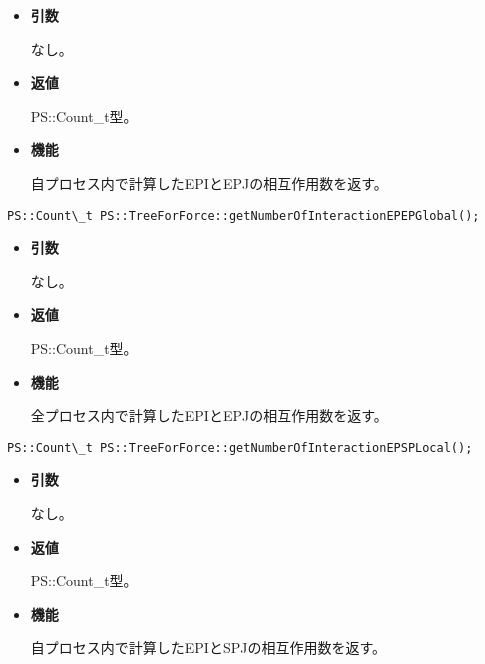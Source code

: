 \begin{itemize}

\item {\bf 引数}

なし。

\item {\bf 返値}

PS::Count\_t型。

\item {\bf 機能}

自プロセス内で計算したEPIとEPJの相互作用数を返す。

\end{itemize}

\begin{screen}
\begin{verbatim}
PS::Count\_t PS::TreeForForce::getNumberOfInteractionEPEPGlobal();
\end{verbatim}
\end{screen}

\begin{itemize}

\item {\bf 引数}

なし。

\item {\bf 返値}

PS::Count\_t型。

\item {\bf 機能}

全プロセス内で計算したEPIとEPJの相互作用数を返す。

\end{itemize}

\begin{screen}
\begin{verbatim}
PS::Count\_t PS::TreeForForce::getNumberOfInteractionEPSPLocal();
\end{verbatim}
\end{screen}

\begin{itemize}

\item {\bf 引数}

なし。

\item {\bf 返値}

PS::Count\_t型。

\item {\bf 機能}

自プロセス内で計算したEPIとSPJの相互作用数を返す。

\end{itemize}

